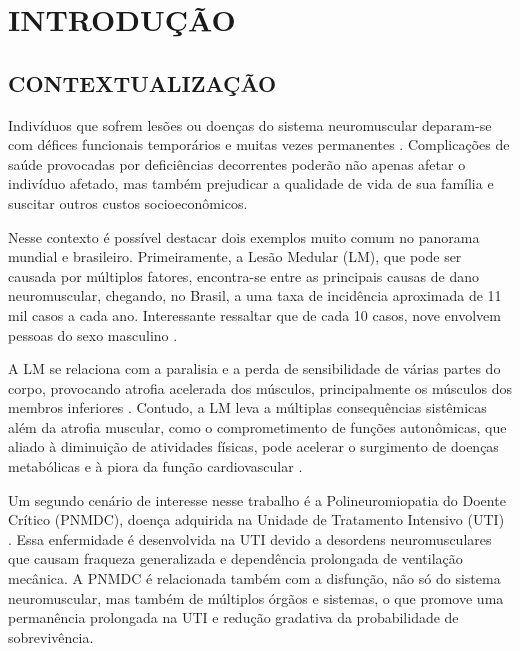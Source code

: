 \chapter{INTRODUÇÃO} 
\label{sec:cap1}

\section{CONTEXTUALIZAÇÃO} 
Indivíduos que sofrem lesões ou doenças do sistema neuromuscular deparam-se com défices funcionais temporários e muitas vezes permanentes \cite{Durand2005ElectricalSystem}. Complicações de saúde provocadas por deficiências decorrentes poderão não apenas afetar o indivíduo afetado, mas também prejudicar a qualidade de vida de sua família e suscitar outros custos socioeconômicos. 

Nesse contexto é possível destacar dois exemplos muito comum no panorama mundial e brasileiro. Primeiramente, a Lesão Medular (\acrshort{LM}), que pode ser causada por múltiplos fatores, encontra-se entre as principais causas de dano neuromuscular, chegando, no Brasil, a uma taxa de incidência aproximada de 11 mil casos a cada ano. Interessante ressaltar que de cada 10 casos, nove envolvem pessoas do sexo masculino \cite{Astur2014LesaoBrasil, Masini2001EstimativaBrasil}.

A \acrshort{LM} se relaciona com a paralisia e a perda de sensibilidade de várias partes do corpo, provocando atrofia acelerada dos músculos, principalmente os músculos dos membros inferiores \cite{Faria2006ImplementacaoMedulares}. Contudo, a \acrshort{LM} leva a múltiplas consequências sistêmicas além da atrofia muscular, como o comprometimento de funções autonômicas, que aliado à diminuição de atividades físicas, pode acelerar o surgimento de doenças metabólicas e à piora da função cardiovascular \cite{Faria2006ImplementacaoMedulares}.

Um segundo cenário de interesse nesse trabalho é a Polineuromiopatia do Doente Crítico (\acrshort{PNMDC}), doença adquirida na Unidade de Tratamento Intensivo (\acrshort{UTI}) \cite{Zamora2013PolineuromiopatiaLiteratura, Miranda2013EletroestimulacaoSistematica}. Essa enfermidade é desenvolvida na \acrshort{UTI} devido a desordens neuromusculares que causam fraqueza generalizada e dependência prolongada de ventilação mecânica. A \acrshort{PNMDC} é relacionada também com a disfunção, não só do sistema neuromuscular, mas também de múltiplos órgãos e sistemas, o que promove uma permanência prolongada na \acrshort{UTI} e redução gradativa da probabilidade de sobrevivência.

